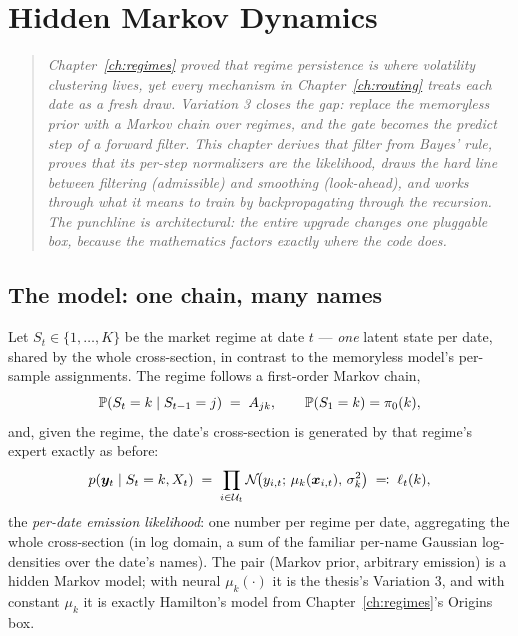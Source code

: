 \chapter{Hidden Markov Dynamics}\label{ch:hmm}

\begin{quote}\itshape
Chapter~\ref{ch:regimes} proved that regime persistence is where
volatility clustering lives, yet every mechanism in
Chapter~\ref{ch:routing} treats each date as a fresh draw. Variation 3
closes the gap: replace the memoryless prior with a Markov chain over
regimes, and the gate becomes the predict step of a forward filter. This
chapter derives that filter from Bayes' rule, proves that its per-step
normalizers are the likelihood, draws the hard line between filtering
(admissible) and smoothing (look-ahead), and works through what it means
to train by backpropagating through the recursion. The punchline is
architectural: the entire upgrade changes one pluggable box, because the
mathematics factors exactly where the code does.
\end{quote}

\section{The model: one chain, many names}\label{sec:hmmmodel}

Let $S_t \in \{1, \dots, K\}$ be the market regime at date $t$ ---
\emph{one} latent state per date, shared by the whole cross-section, in
contrast to the memoryless model's per-sample assignments. The regime
follows a first-order Markov chain,
\[
  \mathbb{P}(S_t = k \mid S_{t-1} = j) \;=\; A_{jk},
  \qquad
  \mathbb{P}(S_1 = k) = \pi_0(k),
\]
and, given the regime, the date's cross-section is generated by that
regime's expert exactly as before:
\begin{equation}\label{eq:hmmemission}
  p(\bm{y}_t \mid S_t = k, X_t)
  \;=\; \prod_{i \in \mathcal{U}_t}
  \mathcal{N}\!\bigl(y_{i,t};\, \mu_k(\bm{x}_{i,t}),\, \sigma_k^2\bigr)
  \;\eqqcolon\; \ell_t(k),
\end{equation}
the \emph{per-date emission likelihood}: one number per regime per date,
aggregating the whole cross-section (in log domain, a sum of the familiar
per-name Gaussian log-densities over the date's names). The pair
(Markov prior, arbitrary emission) is a hidden Markov model; with neural
$\mu_k(\cdot)$ it is the thesis's Variation 3, and with constant
$\mu_k$ it is exactly Hamilton's model from
Chapter~\ref{ch:regimes}'s Origins box.

